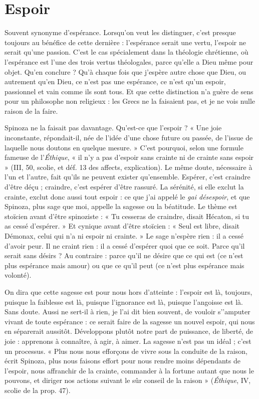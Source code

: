 \section{Espoir}
Souvent synonyme d’espérance. Lorsqu'on veut les distinguer, c’est
presque toujours au bénéfice de cette dernière : l’espérance serait
une vertu, l'espoir ne serait qu’une passion. C’est le cas spécialement dans la
théologie chrétienne, où l’espérance est l’une des trois vertus théologales, parce
qu'elle a Dieu même pour objet. Qu’en conclure ? Qu’à chaque fois que
j'espère autre chose que Dieu, ou autrement qu’en Dieu, ce n’est pas une espérance,
ce n’est qu’un espoir, passionnel et vain comme ils sont tous. Et que
cette distinction n’a guère de sens pour un philosophe non religieux : les Grecs
ne la faisaient pas, et je ne vois nulle raison de la faire.

Spinoza ne la faisait pas davantage. Qu'est-ce que l'espoir ? « Une joie
inconstante, répondait-il, née de l’idée d’une chose future ou passée, de l’issue
de laquelle nous doutons en quelque mesure. » C’est pourquoi, selon une formule
fameuse de l’{\it Éthique}, « il n’y a pas d’espoir sans crainte ni de crainte sans
espoir » (III, 50, scolie, et déf. 13 des affects, explication). Le même doute,
nécessaire à l’un et l’autre, fait qu’ils ne peuvent exister qu’ensemble. Espérer,
c'est craindre d’être déçu ; craindre, c’est espérer d’être rassuré. La sérénité, si
elle exclut la crainte, exclut donc aussi tout espoir : ce que j’ai appelé le {\it gai
désespoir}, et que Spinoza, plus sage que moi, appelle la sagesse ou la béatitude.
Le thème est stoïcien avant d’être spinoziste : « Tu cesseras de craindre, disait
Hécaton, si tu as cessé d’espérer. » Et cynique avant d’être stoïcien : « Seul est
libre, disait Démonax, celui qui n’a ni espoir ni crainte. » Le sage n’espère rien :
il a cessé d’avoir peur. Il ne craint rien : il a cessé d’espérer quoi que ce soit.
Parce qu’il serait sans désirs ? Au contraire : parce qu’il ne désire que ce qui est
(ce n’est plus espérance mais amour) ou que ce qu’il peut (ce n’est plus espérance
mais volonté).

On dira que cette sagesse est pour nous hors d’atteinte : l'espoir est là, toujours,
puisque la faiblesse est là, puisque l'ignorance est là, puisque l’angoisse
est là. Sans doute. Aussi ne sert-il à rien, je l’ai dit bien souvent, de vouloir
s’'amputer vivant de toute espérance : ce serait faire de la sagesse un nouvel
espoir, qui nous en séparerait aussitôt. Développons plutôt notre part de puissance,
de liberté, de joie : apprenons à connaître, à agir, à aimer. La sagesse
n’est pas un idéal ; c’est un processus. « Plus nous nous efforçons de vivre sous
la conduite de la raison, écrit Spinoza, plus nous faisons effort pour nous
rendre moins dépendants de l'espoir, nous affranchir de la crainte, commander
à la fortune autant que nous le pouvons, et diriger nos actions suivant le sûr
conseil de la raison » ({\it Éthique}, IV, scolie de la prop. 47).

